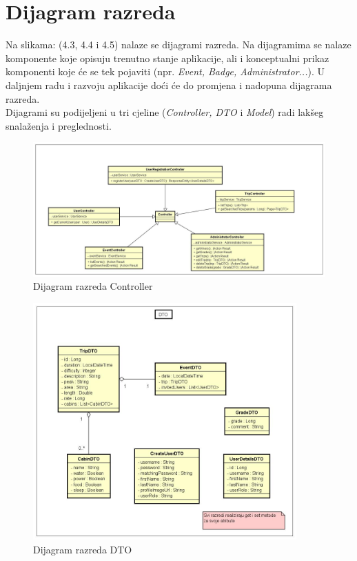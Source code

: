 			
		\section{Dijagram razreda}
			Na slikama: (4.3, 4.4 i 4.5) nalaze se dijagrami razreda. Na dijagramima se nalaze komponente koje opisuju trenutno stanje aplikacije, ali i konceptualni prikaz komponenti koje će se tek pojaviti (npr. \textit{Event, Badge, Administrator...}). U daljnjem radu i razvoju aplikacije doći će do promjena i nadopuna dijagrama razreda. \\
			Dijagrami su podijeljeni u tri cjeline (\textit{Controller, DTO} i \textit{Model}) radi lakšeg snalaženja i preglednosti.
			
			\begin{figure}[H]
				\centering
				\includegraphics[width=1.1\textwidth]{slike/Controller_dijagram.jpg}
				\caption{Dijagram razreda Controller}
				\label{fig:mesh1}
			\end{figure} 
			
			\begin{figure}[H]
				\centering
				\includegraphics[width=0.9\textwidth]{slike/DTO_dijagram.jpg}
				\caption{Dijagram razreda DTO}
				\label{fig:mesh1}
			\end{figure}
			
